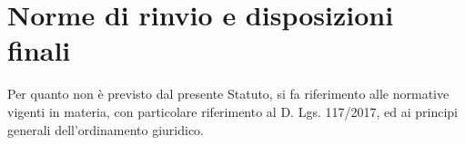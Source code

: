\documentclass[legalpaper, 11pt]{exam}
\let\tempone\enumerate
\let\temptwo\endenumerate
\renewenvironment{enumerate}{\tempone\addtolength{\itemsep}{-0.45\baselineskip}}{\temptwo}
\begin{document}
\section{Norme di rinvio e disposizioni finali}
\begin{enumerate}
 \item Per quanto non è previsto dal presente Statuto, si fa riferimento alle normative vigenti in materia, con particolare riferimento al D. Lgs. 117/2017, ed ai principi generali dell’ordinamento giuridico.
\end{enumerate}
\end{document}
